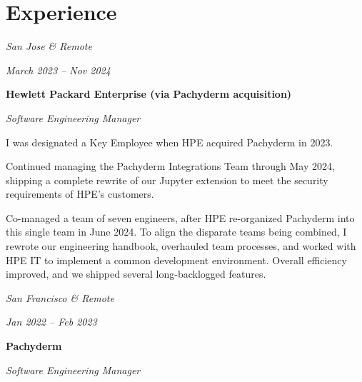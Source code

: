 \documentclass[10pt, letterpaper]{article}
\begin{document}
\section{Experience}

\begin{twocolentry}{
    \textit{San Jose \& Remote}

    \textit{March 2023 – Nov 2024}
}
    \textbf{Hewlett Packard Enterprise (via Pachyderm acquisition)}

    \textit{Software Engineering Manager}
\end{twocolentry}

\vspace{0.1 cm}

\begin{onecolentry}
    \begin{highlights}
        \item I was designated a Key Employee when HPE acquired Pachyderm in 2023.
        \item Continued managing the Pachyderm Integrations Team through May 2024, shipping a complete rewrite of our Jupyter extension to meet the security requirements of HPE's customers.
        \item Co-managed a team of seven engineers, after HPE re-organized Pachyderm into this single team in June 2024. To align the disparate teams being combined, I rewrote our engineering handbook, overhauled team processes, and worked with HPE IT to implement a common development environment. Overall efficiency improved, and we shipped several long-backlogged features.
    \end{highlights}
\end{onecolentry}

\vspace{0.2 cm}

\begin{twocolentry}{
    \textit{San Francisco \& Remote}

    \textit{Jan 2022 – Feb 2023}
}
    \textbf{Pachyderm}

    \textit{Software Engineering Manager}
\end{twocolentry}

\vspace{0.1 cm}
\end{document}
